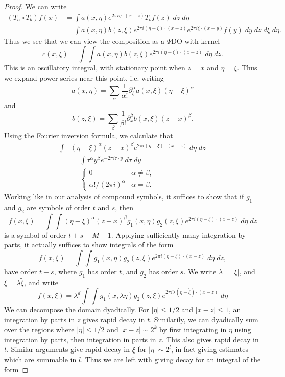 \begin{proof}
    We can write
    \begin{align*}
        (T_a \circ T_b) f(x) &= \int a(x,\eta) e^{2 \pi i \eta \cdot (x - z)} T_b f(z)\; dz\; d\eta\\
        &= \int a(x,\eta) b(z,\xi) e^{2 \pi i (\eta - \xi) \cdot (x - z)} e^{2 \pi i \xi \cdot (x - y)} f(y)\; dy\; dz\; d\xi\; d\eta.
    \end{align*}
    Thus we see that we can view the composition as a $\Psi$DO with kernel
    \[ c(x,\xi) = \int \int a(x,\eta) b(z,\xi) e^{2 \pi i (\eta - \xi) \cdot (x - z)}\; d\eta\; dz. \]
    This is an oscillatory integral, with stationary point when $z = x$ and $\eta = \xi$. Thus we expand power series near this point, i.e. writing
    \[ a(x,\eta) = \sum_\alpha \frac{1}{\alpha!} \partial^\alpha_\xi a(x,\xi) (\eta - \xi)^\alpha \]
    and
    \[ b(z,\xi) = \sum_\beta \frac{1}{\beta!} \partial^\beta_x b(x,\xi) (z - x)^\beta. \]
    Using the Fourier inversion formula, we calculate that
    \begin{align*}
        \int &(\eta - \xi)^\alpha (z - x)^\beta e^{2 \pi i (\eta - \xi) \cdot (x - z)}\; d\eta\; dz\\
        &= \int \tau^\alpha y^\beta e^{-2 \pi i \tau \cdot y}\; d\tau\; dy\\
        &= \begin{cases} 0 & \alpha \neq \beta, \\ \alpha! / (2 \pi i)^\alpha & \alpha = \beta. \end{cases}
    \end{align*}
    Working like in our analysis of compound symbols, it suffices to show that if $g_1$ and $g_2$ are symbols of order $t$ and $s$, then
    \[ f(x,\xi) = \int \int (\eta - \xi)^\alpha (z - x)^\beta g_1(x,\eta) g_2(z,\xi) e^{2 \pi i (\eta - \xi) \cdot (x - z)}\; d\eta\; dz \]
    is a symbol of order $t + s - M - 1$. Applying sufficiently many integration by parts, it actually suffices to show integrals of the form
    \[ f(x,\xi) = \int \int g_1(x,\eta) g_2(z,\xi) e^{2 \pi i (\eta - \xi) \cdot (x - z)}\; d\eta\; dz, \]
    have order $t + s$, where $g_1$ has order $t$, and $g_2$ has order $s$. We write $\lambda = |\xi|$, and $\xi = \lambda \tilde{\xi}$, and write
    \[ f(x,\xi) = \lambda^d \int \int g_1(x, \lambda \eta) g_2(z, \xi) e^{2 \pi i \lambda (\eta - \tilde{\xi}) \cdot (x - z)}\; d\eta \]
    We can decompose the domain dyadically. For $|\eta| \leq 1/2$ and $|x - z| \leq 1$, an integration by parts in $z$ gives rapid decay in $t$. Similarily, we can dyadically sum over the regions where $|\eta| \leq 1/2$ and $|x - z| \sim 2^k$ by first integrating in $\eta$ using integration by parts, then integration in parts in $z$. This also gives rapid decay in $t$. Similar arguments give rapid decay in $\xi$ for $|\eta| \sim 2^l$, in fact giving estimates which are summable in $l$. Thus we are left with giving decay for an integral of the form

\end{proof}
